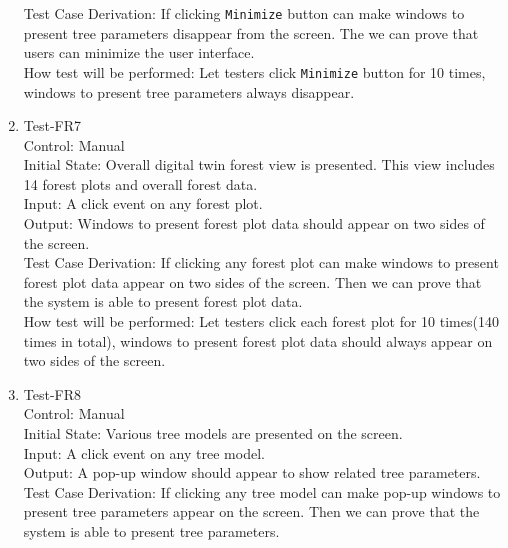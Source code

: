 \documentclass[12pt, titlepage]{article}
\begin{document}
\begin{enumerate}
Test Case Derivation: If clicking \verb|Minimize| button can make windows to present
tree parameters disappear from the screen. The we can prove that users can 
minimize the user interface.\\
					
How test will be performed:  Let testers click \verb|Minimize|
button for 10 times, windows to present tree parameters always disappear.

\item{Test-FR7\\}
Control: Manual\\ 

Initial State: Overall digital twin forest view is presented. This view includes
14 forest plots and overall forest data.\\

Input: A click event on any forest plot.\\

Output: Windows to present forest plot data should appear on two sides of the 
screen.\\

Test Case Derivation: If clicking any forest plot can make windows to present forest
plot data appear on two sides of the screen. Then we can prove that the system is able
to present forest plot data.\\
					
How test will be performed:  Let testers click each forest plot for 10 times(140 times
in total), windows to present forest plot data should always appear on two sides of
the screen.

\item{Test-FR8\\}
Control: Manual\\ 

Initial State: Various tree models are presented on the screen.\\

Input: A click event on any tree model.\\

Output: A pop-up window should appear to show related tree parameters.\\

Test Case Derivation: If clicking any tree model can make pop-up windows to present 
tree parameters appear on the screen. Then we can prove that the system is able
to present tree parameters.\\
					

\end{enumerate}
\end{document}
